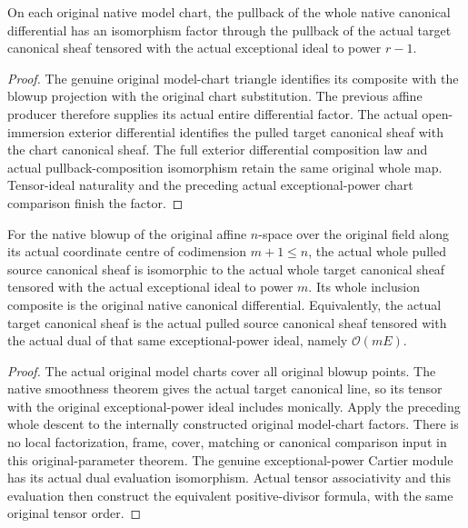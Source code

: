 \begin{lemma}
\label{lem:kn-blowup-canonical-model-chart-factor}
\leanok
{}
On each original native model chart, the pullback of the whole native
canonical differential has an isomorphism factor through the pullback of
the actual target canonical sheaf tensored with the actual exceptional
ideal to power $r-1$.
\end{lemma}
\begin{proof}
The genuine original model-chart triangle identifies its composite with
the blowup projection with the original chart substitution. The previous
affine producer therefore supplies its actual entire differential factor.
The actual open-immersion exterior differential identifies the pulled
target canonical sheaf with the chart canonical sheaf. The full exterior
differential composition law and actual pullback-composition isomorphism
retain the same original whole map. Tensor-ideal naturality and the
preceding actual exceptional-power chart comparison finish the factor.
\end{proof}

\begin{theorem}
\label{thm:kn-blowup-canonical-whole-coordinate-iso}
\leanok
{}
For the native blowup of the original affine $n$-space over the original
field along its actual coordinate centre of codimension $m+1\leq n$,
the actual whole pulled source canonical sheaf is isomorphic to the
actual whole target canonical sheaf tensored with the actual exceptional
ideal to power $m$. Its whole inclusion composite is the original native
canonical differential. Equivalently, the actual target canonical sheaf
is the actual pulled source canonical sheaf tensored with the actual dual
of that same exceptional-power ideal, namely $\mathcal O(mE)$.
\end{theorem}
\begin{proof}
The actual original model charts cover all original blowup points. The
native smoothness theorem gives the actual target canonical line, so its
tensor with the original exceptional-power ideal includes monically.
Apply the preceding whole descent to the internally constructed original
model-chart factors. There is no local factorization, frame, cover,
matching or canonical comparison input in this original-parameter theorem.
The genuine exceptional-power Cartier module has its actual dual evaluation
isomorphism. Actual tensor associativity and this evaluation then construct
the equivalent positive-divisor formula, with the same original tensor order.
\end{proof}

